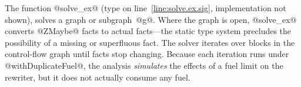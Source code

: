 \documentclass[blockstyle,preprint,natbib,nocopyrightspace]{sigplanconf}
\newenvironment{smallcode}{\par\unskip\small\verbatim}{\endverbatim}
\newcommand\lineref[1]{line~\ref{line:#1}}
\def\authornote#1{\unskip\relax}
\newcommand{\john}[1]{\authornote{JD: #1}}
\newcommand\delendum[1]{\relax\ifvmode\else\unskip\fi\relax}
\newcommand\figref[1]{Figure~\ref{fig:#1}}
\begin{document}
%
\delendum{Hang on!  What kind of graph does {\tt zdfSolveFwd} take?
I assume a full graph, closed at the entry!  So what is this pesky {\tt in\_fact}??}
%



The function @solve_ex@ (type on \lineref{solve.ex.sig}, implementation not
shown), solves a graph or subgraph~@g@.
Where the graph is open, @solve_ex@ converts @ZMaybe@ facts to actual
facts---the static type system precludes the possibility of a missing
or superfluous fact.
The solver iterates
over blocks
\ifcutting\else
 in the control-flow graph
\fi
until facts stop changing.
Because each iteration
runs under @withDuplicateFuel@, 
the analysis
\emph{simulates} the effects of a fuel limit on the rewriter, but it does
not actually consume any fuel.
\end{document}
